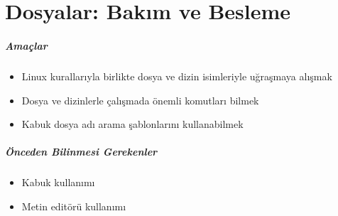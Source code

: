 \chapter{Dosyalar: Bakım ve Besleme}
\label{chap:bolum6}
\paragraph{Amaçlar}
\begin{itemize}
 \item Linux kurallarıyla birlikte dosya ve dizin isimleriyle uğraşmaya alışmak
 \item Dosya ve dizinlerle çalışmada önemli komutları bilmek
 \item Kabuk dosya adı arama şablonlarını kullanabilmek
 \end{itemize}
 
\paragraph{Önceden Bilinmesi Gerekenler}
\begin{itemize}
 \item Kabuk kullanımı
 \item Metin editörü kullanımı
 \end{itemize}


